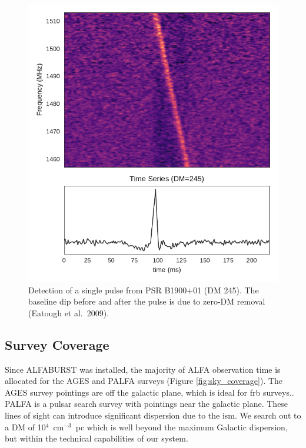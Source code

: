\documentclass[a4paper,fleqn,usenatbib]{mnras}
\begin{document}
\begin{figure}
    \includegraphics[width=1.0\linewidth]{figures/B1900_01.pdf}
    \caption{Detection of a single pulse from PSR B1900+01 (DM 245). The
    baseline dip before and after the pulse is due to zero-DM removal (Eatough
    et al.~2009). }
    \label{fig:B1900}
\end{figure}



\subsection{Survey Coverage}
\label{sec:survey_coverage}

Since ALFABURST was installed, the majority of ALFA observation time is
allocated for the AGES \citep{2006MNRAS.371.1617A} and PALFA
\citep{2006ApJ...637..446C} surveys (Figure \ref{fig:sky_coverage}).  The AGES
survey pointings are off the galactic plane, which is ideal for \gls{frb}
surveys.. PALFA is a pulsar search survey with pointings near the galactic
plane. These lines of sight can introduce significant dispersion due to the
\gls{ism}. We search out to a DM of 10$^{4}$~cm$^{-3}$~pc which is well beyond
the maximum Galactic dispersion, but within the technical capabilities of our
system. 
\end{document}

